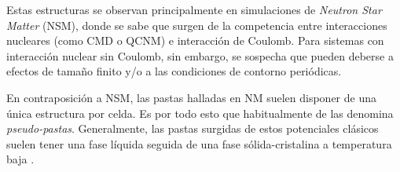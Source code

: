 Estas estructuras se observan principalmente en simulaciones de \textit{Neutron Star Matter} (NSM), donde se sabe que surgen de la competencia entre interacciones nucleares (como CMD o QCNM) e interacción de Coulomb. 
Para sistemas con interacción nuclear sin Coulomb, sin embargo, se sospecha que pueden deberse a efectos de tamaño finito y/o a las condiciones de contorno periódicas.

En contraposición a NSM, las pastas halladas en NM suelen disponer de una única estructura por celda.
Es por todo esto que habitualmente de las denomina \textit{pseudo-pastas}.
Generalmente, las pastas surgidas de estos potenciales clásicos suelen tener una fase líquida seguida de una fase sólida-cristalina a temperatura baja \cite{Dorso2018,Alcain,Dorso2019}.